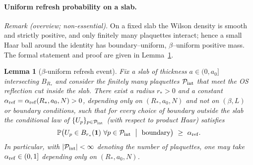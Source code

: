 \documentclass[11pt]{amsart}
\theoremstyle{plain}
\newtheorem{lemma}[theorem]{Lemma}
\theoremstyle{definition}
\theoremstyle{remark}
\begin{document}
\paragraph{Uniform refresh probability on a slab.}
\emph{Remark (overview; non-essential).} On a fixed slab the Wilson density is smooth and strictly positive, and only finitely many plaquettes interact; hence a small Haar ball around the identity has boundary–uniform, $\beta$–uniform positive mass. The formal statement and proof are given in Lemma~\ref{lem:refresh-prob}.
\begin{lemma}[\boldmath$\beta$-uniform refresh event]\label{lem:refresh-prob}
Fix a slab of thickness $a\in(0,a_0]$ intersecting $B_{R_*}$ and consider the finitely many plaquettes $\mathcal P_{\rm int}$ that meet the OS reflection cut inside the slab. There exist a radius $r_*>0$ and a constant $\alpha_{\rm ref}=\alpha_{\rm ref}(R_*,a_0,N)>0$, depending only on $(R_*,a_0,N)$ and not on $(\beta,L)$ or boundary conditions, such that for every choice of boundary outside the slab the conditional law of $\{U_p\}_{p\in\mathcal P_{\rm int}}$ (with respect to product Haar) satisfies
\[
  \mathbb P\big( U_p\in B_{r_*}(\mathbf 1)\ \forall p\in\mathcal P_{\rm int}\ \bigm|\ \text{boundary}\big)\ \ge\ \alpha_{\rm ref}.
\]
In particular, with $|\mathcal P_{\rm int}|<\infty$ denoting the number of plaquettes, one may take $\alpha_{\rm ref}\in(0,1]$ depending only on $(R_*,a_0,N)$.
\end{lemma}
\end{document}
